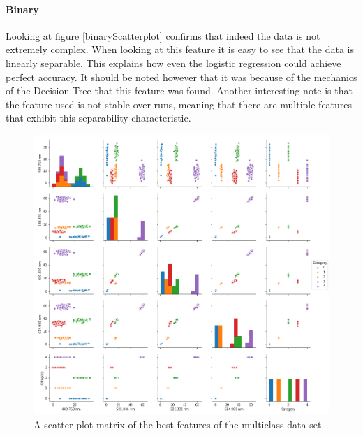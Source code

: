 \documentclass[british]{article}
\begin{document}
	\paragraph{Binary} Looking at figure \ref{binaryScatterplot} confirms that indeed the data is not extremely complex. When looking at this feature it is easy to see that the data is linearly separable. This explains how even the logistic regression could achieve perfect accuracy. It should be noted however that it was because of the mechanics of the Decision Tree that this feature was found. Another interesting note is that the feature used is not stable over runs, meaning that there are multiple features that exhibit this separability characteristic.    
	
	
	
	\begin{figure}[!ht]
		\centering
		\includegraphics[width=\textwidth]{multiclassScatterplot}
		\caption{A scatter plot matrix of the best features of the multiclass data set}
		\label{multiclassScatterplot}
	\end{figure}
	
	
\end{document}
